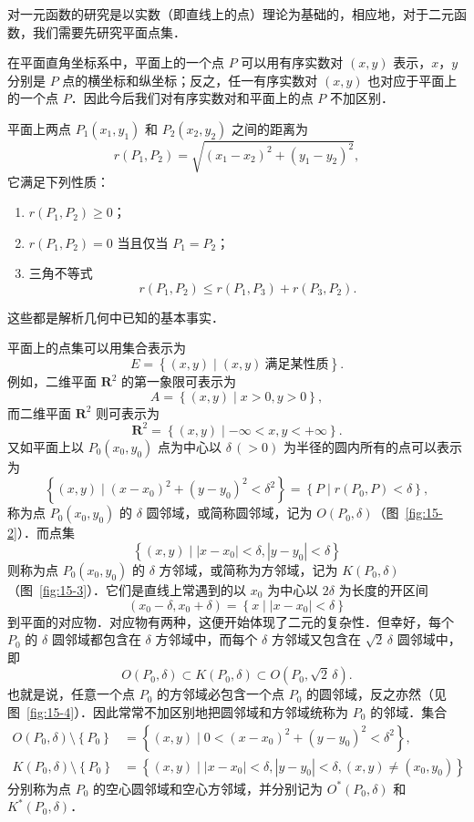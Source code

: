 对一元函数的研究是以实数（即直线上的点）理论为基础的，相应地，对于二元函数，我们需要先研究平面点集．

在平面直角坐标系中，平面上的一个点 $P$ 可以用有序实数对 $(x,y)$ 表示，$x$，$y$ 分别是 $P$ 点的横坐标和纵坐标；反之，任一有序实数对 $(x,y)$ 也对应于平面上的一个点 $P$．因此今后我们对有序实数对和平面上的点 $P$ 不加区别．

平面上两点 $P_{1}(x_{1},y_{1})$ 和 $P_{2}(x_{2},y_{2})$ 之间的距离为
\[
r\left(P_{1},P_{2}\right)=\sqrt{\left(x_{1}-x_{2}\right)^{2}+\left(y_{1}-y_{2}\right)^{2}},
\]
它满足下列性质：
\begin{enumerate}[label=(\arabic*),leftmargin=3em,itemsep=2pt,topsep=2pt]
\item $r(P_{1},P_{2})\geqslant 0$；
\item $r(P_{1},P_{2})=0$ 当且仅当 $P_{1}=P_{2}$；
\item 三角不等式
\[
r\left(P_{1},P_{2}\right)\leqslant r\left(P_{1},P_{3}\right)+r\left(P_{3},P_{2}\right).
\]
\end{enumerate}
这些都是解析几何中已知的基本事实．

平面上的点集可以用集合表示为
\[
E=\left\{(x,y)\mid (x,y)\ \text{满足某性质}\right\}.
\]
例如，二维平面 $\mathbf{R}^{2}$ 的第一象限可表示为
\[
A=\left\{(x,y)\mid x>0,y>0\right\},
\]
而二维平面 $\mathbf{R}^{2}$ 则可表示为
\[
\mathbf{R}^{2}=\left\{(x,y)\mid -\infty<x,y<+\infty\right\}.
\]
又如平面上以 $P_{0}(x_{0},y_{0})$ 点为中心以 $\delta\,(>0)$ 为半径的圆内所有的点可以表示为
\[
\left\{(x,y)\mid \left(x-x_{0}\right)^{2}+\left(y-y_{0}\right)^{2}<\delta^{2}\right\}=\left\{P\mid r\left(P_{0},P\right)<\delta\right\},
\]
称为点 $P_{0}(x_{0},y_{0})$ 的 $\delta$ 圆邻域，或简称圆邻域，记为 $O(P_{0},\delta)$（图~\ref{fig:15-2}）．而点集
\[
\left\{(x,y)\mid \left|x-x_{0}\right|<\delta,\left|y-y_{0}\right|<\delta\right\}
\]
则称为点 $P_{0}(x_{0},y_{0})$ 的 $\delta$ 方邻域，或简称为方邻域，记为 $K(P_{0},\delta)$（图~\ref{fig:15-3}）．它们是直线上常遇到的以 $x_{0}$ 为中心以 $2\delta$ 为长度的开区间
\[
\left(x_{0}-\delta,x_{0}+\delta\right)=\left\{x\mid \left|x-x_{0}\right|<\delta\right\}
\]
到平面的对应物．对应物有两种，这便开始体现了二元的复杂性．但幸好，每个 $P_{0}$ 的 $\delta$ 圆邻域都包含在 $\delta$ 方邻域中，而每个 $\delta$ 方邻域又包含在 $\sqrt{2}\,\delta$ 圆邻域中，即
\[
O\left(P_{0},\delta\right)\subset K\left(P_{0},\delta\right)\subset O\left(P_{0},\sqrt{2}\,\delta\right).
\]
也就是说，任意一个点 $P_{0}$ 的方邻域必包含一个点 $P_{0}$ 的圆邻域，反之亦然（见图~\ref{fig:15-4}）．因此常常不加区别地把圆邻域和方邻域统称为 $P_{0}$ 的邻域．集合
\[
\begin{aligned}
O\left(P_{0},\delta\right)\setminus\left\{P_{0}\right\}&=\left\{(x,y)\mid 0<\left(x-x_{0}\right)^{2}+\left(y-y_{0}\right)^{2}<\delta^{2}\right\},\\
K\left(P_{0},\delta\right)\setminus\left\{P_{0}\right\}&=\left\{(x,y)\mid \left|x-x_{0}\right|<\delta,\left|y-y_{0}\right|<\delta,(x,y)\neq(x_{0},y_{0})\right\}
\end{aligned}
\]
分别称为点 $P_{0}$ 的空心圆邻域和空心方邻域，并分别记为 $O^{*}(P_{0},\delta)$ 和 $K^{*}(P_{0},\delta)$．


